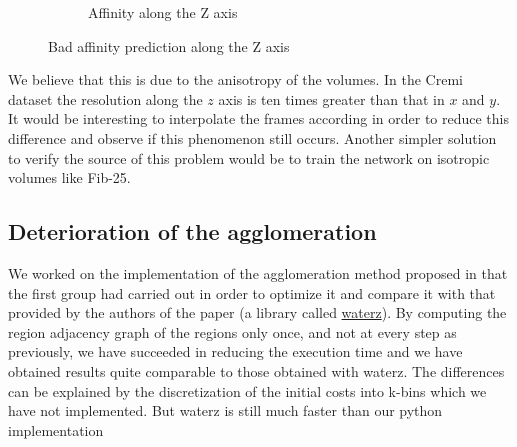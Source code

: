 \begin{figure}[!htbp]
\begin{subfigure}[t]{0.31\textwidth}
        \caption{Affinity along the Z axis}
    \end{subfigure}
	\caption{Bad affinity prediction along the Z axis}
	\label{fig:grid}
\end{figure}

We believe that this is due to the anisotropy of the volumes. In the Cremi dataset the resolution along the $z$ axis is ten times greater than that in $x$ and $y$. It would be interesting to interpolate the frames according in order to reduce this difference and observe if this phenomenon still occurs. Another simpler solution to verify the source of this problem would be to train the network on isotropic volumes like Fib-25.\\

\subsection{Deterioration of the agglomeration}

We worked on the implementation of the agglomeration method proposed in \cite{funke_large_2019} that the first group had carried out in order to optimize it and compare it with that provided by the authors of the paper (a library called \href{https://github.com/funkey/waterz}{waterz}). By computing the region adjacency graph of the regions only once, and not at every step as previously, we have succeeded in reducing the execution time and we have obtained results quite comparable to those obtained with waterz. The differences can be explained by the discretization of the initial costs into k-bins which we have not implemented. But waterz is still much faster than our python implementation\\

